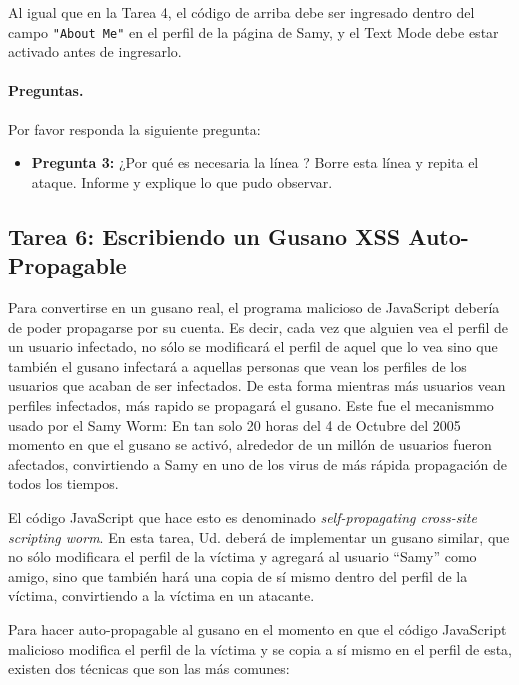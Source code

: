 Al igual que en la Tarea 4, el código de arriba debe ser ingresado dentro del campo \texttt{"About Me"} en el perfil de la página de Samy, y el Text Mode debe estar activado antes de ingresarlo.


\paragraph{Preguntas.} Por favor responda la siguiente pregunta:


\begin{itemize}
\item \textbf{Pregunta 3:} ¿Por qué es necesaria la línea ? Borre esta línea y repita el ataque. Informe y explique lo que pudo observar.
\end{itemize}
 



\subsection{Tarea 6: Escribiendo un Gusano XSS Auto-Propagable}

Para convertirse en un gusano real, el programa malicioso de JavaScript debería de poder propagarse por su cuenta. 
Es decir, cada vez que alguien vea el perfil de un usuario infectado, no sólo se modificará el perfil de aquel que lo vea sino que también el gusano infectará a aquellas personas que vean los perfiles de los usuarios que acaban de ser infectados. De esta forma mientras más usuarios vean perfiles infectados, más rapido se propagará el gusano.
Este fue el mecanismmo usado por el Samy Worm:
En tan solo 20 horas del 4 de Octubre del 2005 momento en que el gusano se activó, alrededor de un millón de usuarios fueron afectados, convirtiendo a Samy en uno de los virus de más rápida propagación de todos los tiempos.

El código JavaScript que hace esto es denominado
{\em self-propagating cross-site scripting worm}. En esta tarea, Ud. deberá de implementar un gusano similar, que no sólo modificara el perfil de la víctima y agregará al usuario ``Samy'' como amigo, sino que también hará una copia de sí mismo dentro del perfil de la víctima, convirtiendo a la víctima en un atacante.

Para hacer auto-propagable al gusano en el momento en que el código JavaScript malicioso modifica el perfil de la víctima y se copia a sí mismo en el perfil de esta, existen dos técnicas que son las más comunes:


